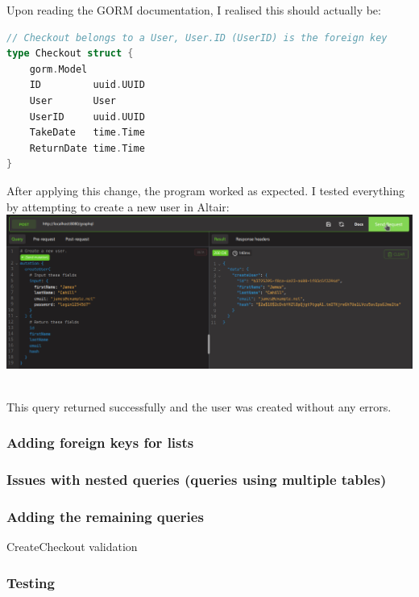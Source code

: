 \documentclass[12pt,a4paper]{article}
\begin{document}
\noindent Upon reading the GORM documentation, I realised this should actually be:

\begin{lstlisting}[language=Go]
// Checkout belongs to a User, User.ID (UserID) is the foreign key
type Checkout struct {
    gorm.Model
    ID         uuid.UUID
    User       User
    UserID     uuid.UUID
    TakeDate   time.Time
    ReturnDate time.Time
}
\end{lstlisting}

\noindent After applying this change, the program worked as expected. I tested everything by attempting to create a new user in Altair:\\

\includegraphics[width=15cm]{implementation/first iteration/postgreproblems altair working.png}

\noindent \\ This query returned successfully and the user was created without any errors.

\subsubsection{Adding foreign keys for lists}

\subsubsection{Issues with nested queries (queries using multiple tables)}

\subsubsection{Adding the remaining queries}

CreateCheckout validation

\subsubsection{Testing}
\end{document}

